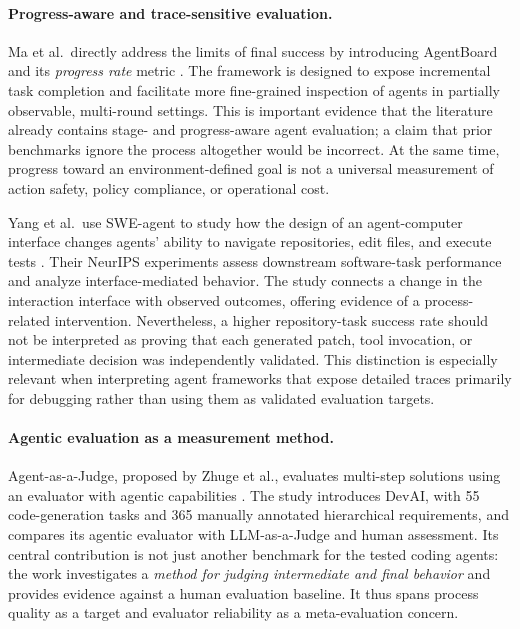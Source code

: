 \paragraph{Progress-aware and trace-sensitive evaluation.}
Ma et al.\ directly address the limits of final success by introducing AgentBoard and its \emph{progress rate} metric \cite{ma2024agentboard}. The framework is designed to expose incremental task completion and facilitate more fine-grained inspection of agents in partially observable, multi-round settings. This is important evidence that the literature already contains stage- and progress-aware agent evaluation; a claim that prior benchmarks ignore the process altogether would be incorrect. At the same time, progress toward an environment-defined goal is not a universal measurement of action safety, policy compliance, or operational cost.

Yang et al.\ use SWE-agent to study how the design of an agent-computer interface changes agents' ability to navigate repositories, edit files, and execute tests \cite{yang2024sweagent}. Their NeurIPS experiments assess downstream software-task performance and analyze interface-mediated behavior. The study connects a change in the interaction interface with observed outcomes, offering evidence of a process-related intervention. Nevertheless, a higher repository-task success rate should not be interpreted as proving that each generated patch, tool invocation, or intermediate decision was independently validated. This distinction is especially relevant when interpreting agent frameworks that expose detailed traces primarily for debugging rather than using them as validated evaluation targets.

\paragraph{Agentic evaluation as a measurement method.}
Agent-as-a-Judge, proposed by Zhuge et al., evaluates multi-step solutions using an evaluator with agentic capabilities \cite{zhuge2025agentjudge}. The study introduces DevAI, with 55 code-generation tasks and 365 manually annotated hierarchical requirements, and compares its agentic evaluator with LLM-as-a-Judge and human assessment. Its central contribution is not just another benchmark for the tested coding agents: the work investigates a \emph{method for judging intermediate and final behavior} and provides evidence against a human evaluation baseline. It thus spans process quality as a target and evaluator reliability as a meta-evaluation concern.

